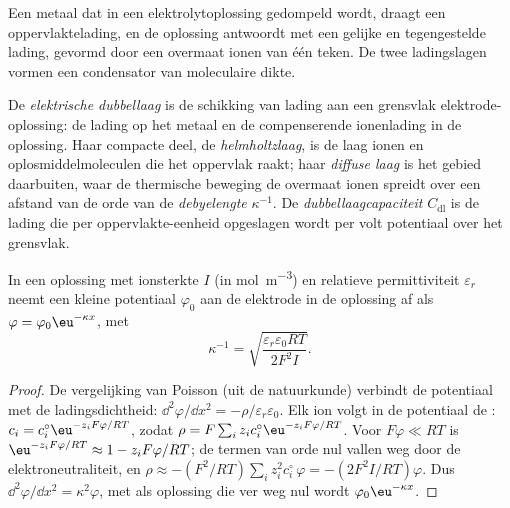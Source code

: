 Een metaal dat in een elektrolytoplossing gedompeld wordt, draagt een
oppervlaktelading, en de oplossing antwoordt met een gelijke en
tegengestelde lading, gevormd door een overmaat ionen van één teken. De
twee ladingslagen vormen een condensator van moleculaire dikte.

\begin{definition}\label{def:b3:electrode-kinetics:double-layer}
De \emph{elektrische dubbellaag} is de
schikking van lading aan een grensvlak elektrode-oplossing: de lading op
het metaal en de compenserende ionenlading in de oplossing. Haar compacte
deel, de
\emph{helmholtzlaag}, is de laag ionen en
oplosmiddelmoleculen die het oppervlak raakt; haar
\emph{diffuse laag}
is het gebied daarbuiten, waar de thermische beweging de overmaat ionen
spreidt over een afstand van de orde van de
\emph{debyelengte} $\kappa^{-1}$. De
\emph{dubbellaagcapaciteit} $C_{\mathrm{dl}}$
is de lading die per oppervlakte-eenheid opgeslagen wordt per volt
potentiaal over het grensvlak.
\end{definition}

\begin{proposition}[Debyelengte]\label{prop:b3:electrode-kinetics:debye-length}
In een oplossing met ionsterkte $I$ (in \unit{mol.m^{-3}}) en relatieve
permittiviteit
$\varepsilon_r$ neemt een kleine potentiaal $\varphi_0$ aan de elektrode in
de oplossing af als
$\varphi = \varphi_0\eu^{-\kappa x}$, met
\[
  \kappa^{-1} = \sqrt{\frac{\varepsilon_r\varepsilon_0RT}{2F^2I}} .
\]
\end{proposition}

\begin{proof}
De vergelijking van Poisson (uit de natuurkunde) verbindt de potentiaal
met de ladingsdichtheid:
$\dd^2\varphi/\dd x^2 = -\rho/\varepsilon_r\varepsilon_0$. Elk ion volgt in de
potentiaal de : $c_i = c_i^{\circ}\eu^{-z_iF\varphi/RT}$, zodat $\rho = F\sum_iz_ic_i^{\circ}\eu^{-z_iF\varphi/RT}$. Voor $F\varphi \ll RT$
is
$\eu^{-z_iF\varphi/RT} \approx 1 - z_iF\varphi/RT$; de termen van orde nul vallen weg door de
elektroneutraliteit,
en $\rho \approx -(F^2/RT)\sum_iz_i^2c_i^{\circ}\,\varphi = -(2F^2I/RT)\varphi$. Dus $\dd^2\varphi/\dd x^2 = \kappa^2\varphi$, met als
oplossing die ver weg nul wordt $\varphi_0\eu^{-\kappa x}$.
\end{proof}

